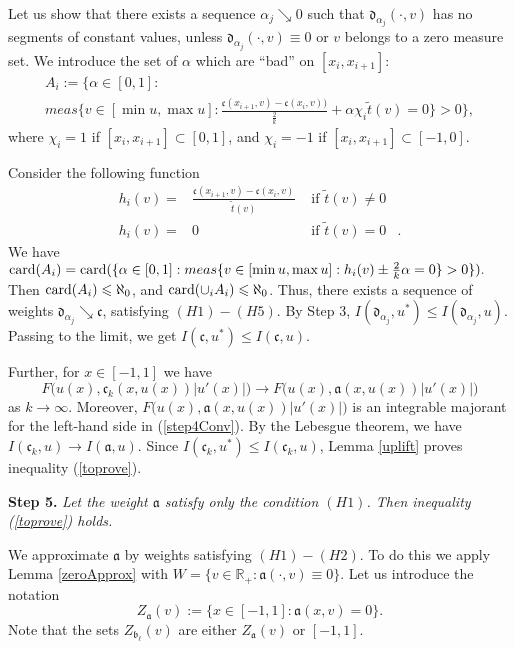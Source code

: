 \documentclass[12pt]{article}
\newcommand{\Real}{\mathbb R}
\renewcommand{\le}{\leqslant}
\newcommand{\card}{{\rm card}}
\begin{document}
Let us show that there exists a sequence $\alpha_j \searrow 0$
such that $\mathfrak d_{\alpha_j}(\cdot, v)$ has no segments of constant values,
unless $\mathfrak d_{\alpha_j}(\cdot, v) \equiv 0$ or $v$ belongs to a zero measure set.
We introduce the set of $\alpha$ which are ``bad'' on $[x_i, x_{i + 1}]$:
\begin{multline*}
A_i := \big \{\alpha \in [0, 1]: \\
meas \{v \in [\min u, \max u]: \frac{\mathfrak c(x_{i + 1}, v) - \mathfrak c(x_i, v))}{\frac{2}{k}} + \alpha \chi_i \tilde{t} (v) = 0 \} > 0 \big \},
\end{multline*}
where $\chi_i = 1$ if $[x_i, x_{i + 1}] \subset [0, 1]$, and $\chi_i = -1$ if $[x_i, x_{i + 1}] \subset [-1, 0]$.

Consider the following function
$$
\begin{aligned}
h_i(v) = & \frac{\mathfrak c(x_{i + 1}, v) - \mathfrak c(x_i, v)}{\tilde{t} (v)} & \text{ if } \tilde{t} (v) \neq 0 & \\
h_i(v) = & 0 & \text{ if } \tilde{t} (v) = 0 &.
\end{aligned}
$$
We have $\card(A_i) = \card(\{ \alpha \in [0, 1]: meas \{ v \in [\min u, \max u]: h_i(v) \pm \frac{2}{k} \alpha = 0 \} > 0 \}).$
Then $\card(A_i) \le \aleph_0$, and $\card(\cup_i A_i) \le \aleph_0$.
Thus, there exists a sequence of weights $\mathfrak d_{\alpha_j} \searrow \mathfrak c$, satisfying $(H1)-(H5)$.
By Step 3, $I(\mathfrak d_{\alpha_j}, u^*) \le I(\mathfrak d_{\alpha_j}, u)$.
Passing to the limit, we get $I(\mathfrak c, u^*) \le I(\mathfrak c, u)$.

Further, for $x \in [-1, 1]$ we have
\begin{equation}
\label{step4Conv}
F\big(u(x), \mathfrak c_k(x, u(x)) |u'(x)|\big) \to F\big(u(x), \mathfrak a(x, u(x)) |u'(x)|\big)
\end{equation}
as $k \to \infty$.
Moreover, $F\big(u(x), \mathfrak a(x, u(x)) |u'(x)|\big)$ is an integrable majorant
for the left-hand side in (\ref{step4Conv}).
By the Lebesgue theorem, we have $I(\mathfrak c_k, u) \to I(\mathfrak a, u)$.
Since $I(\mathfrak c_k, u^*) \le I(\mathfrak c_k, u)$, Lemma \ref{uplift} proves inequality (\ref{toprove}).

\bigskip
{\bf Step 5.} {\it Let the weight $\mathfrak a$ satisfy only the condition $(H1)$.
Then inequality (\ref{toprove}) holds.}

We approximate $\mathfrak a$ by weights satisfying $(H1)-(H2)$.
To do this we apply Lemma \ref{zeroApprox} with $W = \{ v \in \Real_+: \mathfrak a(\cdot, v) \equiv 0 \}$.
Let us introduce the notation $$Z_{\mathfrak a}(v) := \{ x \in [-1, 1]: \mathfrak a(x, v) = 0 \}.$$
Note that the sets $Z_{\mathfrak b_{\ell}}(v)$ are either $Z_{\mathfrak a}(v)$ or $[-1, 1]$.
\end{document}
